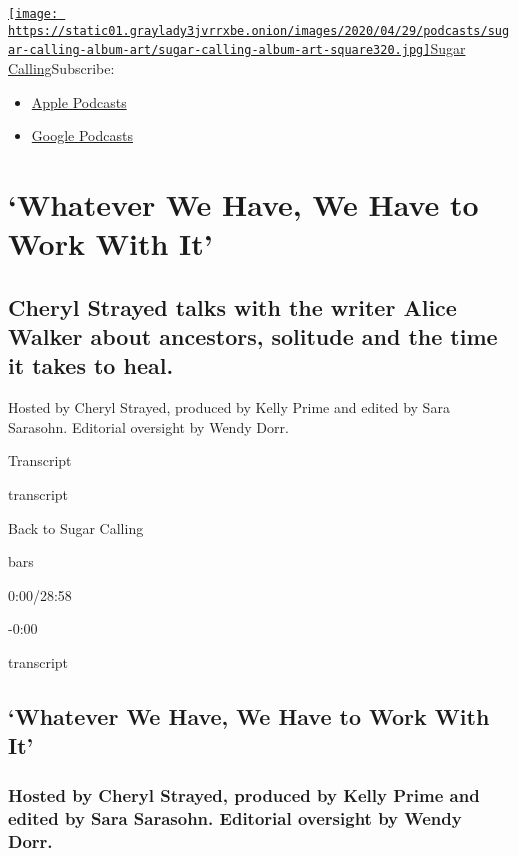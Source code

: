 \href{https://www.nytimes3xbfgragh.onion/column/sugar-calling}{\texttt{[image: https://static01.graylady3jvrrxbe.onion/images/2020/04/29/podcasts/sugar-calling-album-art/sugar-calling-album-art-square320.jpg]}Sugar
Calling}Subscribe:

\begin{itemize}
\tightlist
\item
  \href{https://itunes.apple.com/us/podcast/id1505881384}{Apple
  Podcasts}
\item
  \href{https://podcasts.google.com/?feed=aHR0cHM6Ly9yc3MuYXJ0MTkuY29tL3N1Z2FyLWNhbGxpbmc\&ved=0CAUQrrcFahcKEwjA8Kyn09voAhUAAAAAHQAAAAAQBQ}{Google
  Podcasts}
\end{itemize}

\hypertarget{whatever-we-have-we-have-to-work-with-it-1}{%
\section{`Whatever We Have, We Have to Work With
It'}\label{whatever-we-have-we-have-to-work-with-it-1}}

\hypertarget{cheryl-strayed-talks-with-the-writer-alice-walker-about-ancestors-solitude-and-the-time-it-takes-to-heal-1}{%
\subsection{Cheryl Strayed talks with the writer Alice Walker about
ancestors, solitude and the time it takes to
heal.}\label{cheryl-strayed-talks-with-the-writer-alice-walker-about-ancestors-solitude-and-the-time-it-takes-to-heal-1}}

Hosted by Cheryl Strayed, produced by Kelly Prime and edited by Sara
Sarasohn. Editorial oversight by Wendy Dorr.

Transcript

transcript

Back to Sugar Calling

bars

0:00/28:58

-0:00

transcript

\hypertarget{whatever-we-have-we-have-to-work-with-it-2}{%
\subsection{`Whatever We Have, We Have to Work With
It'}\label{whatever-we-have-we-have-to-work-with-it-2}}

\hypertarget{hosted-by-cheryl-strayed-produced-by-kelly-prime-and-edited-by-sara-sarasohn-editorial-oversight-by-wendy-dorr-1}{%
\subsubsection{Hosted by Cheryl Strayed, produced by Kelly Prime and
edited by Sara Sarasohn. Editorial oversight by Wendy
Dorr.}\label{hosted-by-cheryl-strayed-produced-by-kelly-prime-and-edited-by-sara-sarasohn-editorial-oversight-by-wendy-dorr-1}}

